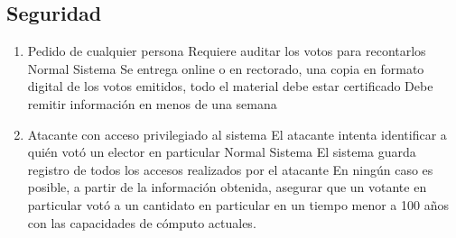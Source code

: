 \subsection{Seguridad}

\begin{enumerate}
 \item {}
{Pedido de cualquier persona}
{Requiere auditar los votos para recontarlos}
{Normal}
{Sistema}
{Se entrega online o en rectorado, una copia en formato digital de los votos emitidos, todo el material debe estar certificado}
{Debe remitir información en menos de una semana}
\medskip

\item {}
{Atacante con acceso privilegiado al sistema}
{El atacante intenta identificar a quién votó un elector en particular}
{Normal}
{Sistema}
{El sistema guarda registro de todos los accesos realizados por el atacante}
{En ningún caso es posible, a partir de la información obtenida, asegurar que un votante en particular votó a un cantidato en particular en un tiempo menor a 100 años con las capacidades de cómputo actuales.}

\end{enumerate}


